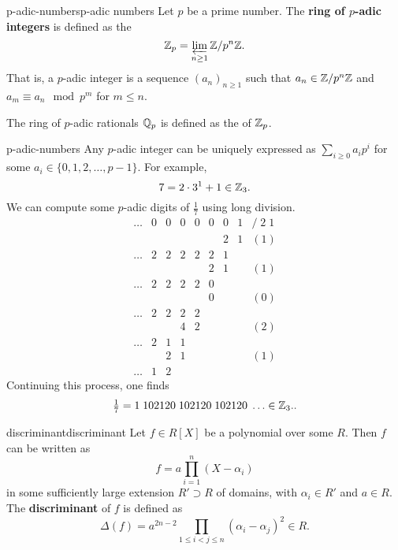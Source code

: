 \begin{topic}{p-adic-numbers}{p-adic numbers}
    Let $p$ be a prime number. The \textbf{ring of $p$-adic integers} is defined as the 
    \[ \mathbb{Z}_p = \varprojlim_{n \ge 1} \mathbb{Z} / p^n \mathbb{Z} . \]
    That is, a $p$-adic integer is a sequence $(a_n)_{n \ge 1}$ such that $a_n \in \mathbb{Z} / p^n \mathbb{Z}$ and $a_m \equiv a_n \mod p^m$ for $m \le n$.
    
    The ring of $p$-adic rationals $\mathbb{Q}_p$ is defined as the  of $\mathbb{Z}_p$.
\end{topic}

\begin{example}{p-adic-numbers}
    Any $p$-adic integer can be uniquely expressed as $\sum_{i \ge 0} a_i p^i$ for some $a_i \in \{ 0, 1, 2, \ldots, p - 1 \}$. For example,
    \[ 7 = 2 \cdot 3^1 + 1 \in \mathbb{Z}_3 . \]
    We can compute some $p$-adic digits of $\tfrac{1}{7}$ using long division.
    \[ \begin{array}{ccccccccl}
        \ldots & 0 & 0 & 0 & 0 & 0 & 0 & 1 & / \; 2 \; 1 \\
               &   &   &   &   &   & 2 & 1 & (1) \\ \hline
        \ldots & 2 & 2 & 2 & 2 & 2 & 1 \\
               &   &   &   &   & 2 & 1 &   & (1) \\ \hline
        \ldots & 2 & 2 & 2 & 2 & 0 \\
               &   &   &   &   & 0 &   &   & (0) \\ \hline
        \ldots & 2 & 2 & 2 & 2 \\
               &   &   & 4 & 2 &   &   &   & (2) \\ \hline
        \ldots & 2 & 1 & 1 \\
               &   & 2 & 1 &   &   &   &   & (1) \\ \hline
        \ldots & 1 & 2
    \end{array} \]
    Continuing this process, one finds
    \[ \tfrac{1}{7} = 1 \; 1 0 2 1 2 0 \; 1 0 2 1 2 0 \; 1 0 2 1 2 0 \; \ldots \in \mathbb{Z}_3 . . \]
\end{example}

\begin{topic}{discriminant}{discriminant}
    Let $f \in R[X]$ be a polynomial over some  $R$. Then $f$ can be written as
    \[ f = a \prod_{i = 1}^n (X - \alpha_i) \]
    in some sufficiently large extension $R' \supset R$ of domains, with $\alpha_i \in R'$ and $a \in R$. The \textbf{discriminant} of $f$ is defined as
    \[ \Delta(f) = a^{2n - 2} \prod_{1 \le i < j \le n} (\alpha_i - \alpha_j)^2 \in R . \]
\end{topic}

